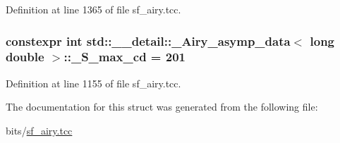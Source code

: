 Definition at line 1365 of file sf\+\_\+airy.\+tcc.

\subsubsection[{\texorpdfstring{\+\_\+\+S\+\_\+max\+\_\+cd}{_S_max_cd}}]{\setlength{\rightskip}{0pt plus 5cm}constexpr int {\bf std\+::\+\_\+\+\_\+detail\+::\+\_\+\+Airy\+\_\+asymp\+\_\+data}$<$ long double $>$\+::\+\_\+\+S\+\_\+max\+\_\+cd = 201\hspace{0.3cm}{\ttfamily [static]}}\hypertarget{structstd_1_1____detail_1_1__Airy__asymp__data_3_01long_01double_01_4_a6a21ac69ffc53d33ebc346981bc52b9a}{}\label{structstd_1_1____detail_1_1__Airy__asymp__data_3_01long_01double_01_4_a6a21ac69ffc53d33ebc346981bc52b9a}


Definition at line 1155 of file sf\+\_\+airy.\+tcc.



The documentation for this struct was generated from the following file\+:\begin{DoxyCompactItemize}
\item 
bits/\hyperlink{sf__airy_8tcc}{sf\+\_\+airy.\+tcc}\end{DoxyCompactItemize}
